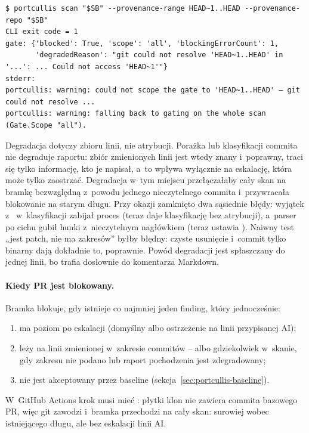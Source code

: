\begin{lstlisting}
$ portcullis scan "$SB" --provenance-range HEAD~1..HEAD --provenance-repo "$SB"
CLI exit code = 1
gate: {'blocked': True, 'scope': 'all', 'blockingErrorCount': 1,
       'degradedReason': "git could not resolve 'HEAD~1..HEAD' in '...': ... Could not access 'HEAD~1'"}
stderr:
portcullis: warning: could not scope the gate to 'HEAD~1..HEAD' — git could not resolve ...
portcullis: warning: falling back to gating on the whole scan (Gate.Scope "all").
\end{lstlisting}

Degradacja dotyczy zbioru linii, nie atrybucji. Porażka  lub
klasyfikacji commita nie degraduje raportu: zbiór zmienionych linii jest wtedy znany
i~poprawny, traci się tylko informację, kto je napisał, a~to wpływa wyłącznie na eskalację,
która może tylko zaostrzać. Degradacja w~tym miejscu przełączałaby cały skan na bramkę
bezwzględną z~powodu jednego nieczytelnego commita i~przywracała blokowanie na starym
długu. Przy okazji zamknięto dwa sąsiednie błędy: wyjątek z~
w~klasyfikacji zabijał proces (teraz daje klasyfikację bez atrybucji), a~parser po cichu
gubił hunki z~nieczytelnym nagłówkiem (teraz ustawia ).
Naiwny test „jest patch, nie ma zakresów” byłby błędny: czyste usunięcie i~commit tylko
binarny dają dokładnie to, poprawnie. Powód degradacji jest spłaszczany do jednej linii,
bo trafia dosłownie do komentarza Markdown.

\paragraph{Kiedy PR jest blokowany.} Bramka blokuje, gdy istnieje co najmniej jeden
finding, który jednocześnie:
\begin{enumerate}[leftmargin=*]
  \item ma poziom  po eskalacji (domyślny  albo ostrzeżenie
        na linii przypisanej AI);
  \item leży na linii zmienionej w~zakresie commitów -- albo gdziekolwiek w~skanie, gdy
        zakresu nie podano lub raport pochodzenia jest zdegradowany;
  \item nie jest akceptowany przez baseline (sekcja~\ref{sec:portcullis-baseline}).
\end{enumerate}
W~GitHub Actions krok  musi mieć :
płytki klon nie zawiera commita bazowego PR, więc git zawodzi i~bramka przechodzi na cały
skan: surowiej wobec istniejącego długu, ale bez eskalacji linii AI.

